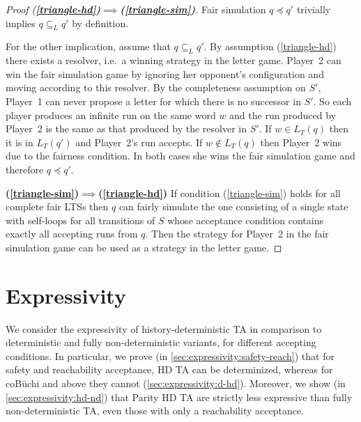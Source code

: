 \documentclass[10pt,a4paper]{amsart}
\theoremstyle{definition}
\numberwithin{equation}{section}
\newcommand{\lang}{L_T}  %
\newcommand{\langincl}[1][L]{\subseteq_{L}}
\newcommand{\fairsim}[1][]{\preceq}
\newcommand{\lts}{S}
\begin{document}
\begin{proof}[Proof (\textbf{\ref{triangle-hd})$\implies$(\ref{triangle-sim})}]
Fair simulation $q \fairsim q'$ trivially implies $q \langincl q'$ by definition.

For the other implication, assume that $q \langincl q'$.
By assumption (\ref{triangle-hd}) there exists a resolver, i.e.~a winning strategy in the letter game.
    Player~2 can win the fair simulation game by ignoring her opponent's configuration and moving according to this resolver. By the completeness assumption on $\lts'$,
    Player~1 can never propose a letter for which there is no successor in $\lts'$. So each player produces an infinite run on the same word $w$ and the run produced by Player~2 is the same as that produced by the resolver in $\lts'$. 
    If $w\in\lang(q)$ then it is in $\lang(q')$ and Player~2's run accepts.
    If $w\notin\lang(q)$ then Player~2 wins due to the fairness condition.
    In both cases she wins the fair simulation game and therefore $q \fairsim q'$.


    \textbf{(\ref{triangle-sim})$\implies$(\ref{triangle-hd})}
    If condition (\ref{triangle-sim}) holds for all complete fair LTSs then $q$ can fairly simulate the one
    consisting of a single state with self-loops for all transitions of $\lts$ whose acceptance condition contains exactly all accepting runs from $q$. Then the strategy for Player~2 in the fair simulation game
    can be used as a strategy in the letter game.
\end{proof}
	
	
	\section{Expressivity}
	\label{sec:expressivity}
We consider the expressivity of history-deterministic TA in comparison to deterministic and fully non-deterministic variants, for different accepting conditions.
In particular, we prove (in \cref{sec:expressivity:safety-reach}) 
that for safety and reachability acceptance, HD TA can be determinized,
whereas for coB\"uchi and above they cannot (\cref{sec:expressivity:d-hd}).
Moreover, we show (in \cref{sec:expressivity:hd-nd}) that Parity HD TA are strictly less expressive than fully non-deterministic TA, even those with only a reachability acceptance.
\end{document}
